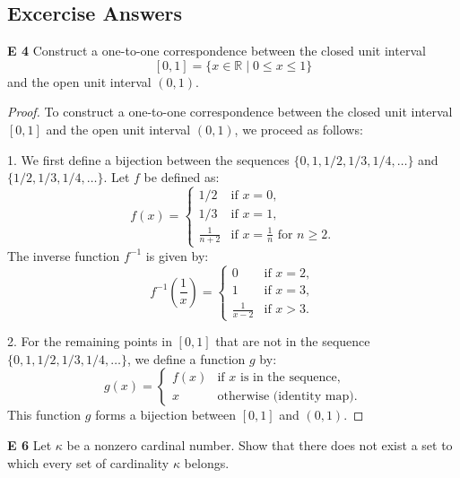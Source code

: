 \subsection{Excercise Answers}
\begin{question}
    \textbf{E 4} Construct a one-to-one correspondence between the closed unit interval
    \[
    [0, 1] = \{x \in \mathbb{R} \mid 0 \leq x \leq 1\}
    \]
    and the open unit interval \((0, 1)\).  

\end{question}
\begin{proof}
    To construct a one-to-one correspondence between the closed unit interval \([0, 1]\) and the open unit interval \((0, 1)\), we proceed as follows:

    1. We first define a bijection between the sequences \(\{0, 1, 1/2, 1/3, 1/4, \ldots\}\) and \(\{1/2, 1/3, 1/4, \ldots\}\). Let \(f\) be defined as:
    \[
    f(x) = 
    \begin{cases} 
    1/2 & \text{if } x = 0, \\
    1/3 & \text{if } x = 1, \\
    \frac{1}{n + 2} & \text{if } x = \frac{1}{n} \text{ for } n \geq 2.
    \end{cases}
    \]
    The inverse function \(f^{-1}\) is given by:
    \[
    f^{-1}\left(\frac{1}{x}\right) = 
    \begin{cases} 
    0 & \text{if } x = 2, \\
    1 & \text{if } x = 3, \\
    \frac{1}{x - 2} & \text{if } x > 3.
    \end{cases}
    \]

    2. For the remaining points in \([0, 1]\) that are not in the sequence \(\{0, 1, 1/2, 1/3, 1/4, \ldots\}\), we define a function \(g\) by:
    \[
    g(x) = 
    \begin{cases} 
    f(x) & \text{if } x \text{ is in the sequence}, \\
    x & \text{otherwise (identity map)}.
    \end{cases}
    \]
    This function \(g\) forms a bijection between \([0, 1]\) and \((0, 1)\).

\end{proof}
\begin{question}
    \textbf{E 6} Let $\kappa$ be a nonzero cardinal number. Show that there does not exist a set to which every set of cardinality $\kappa$ belongs.
\end{question}
